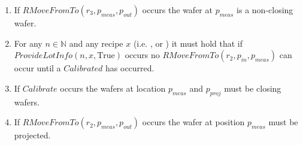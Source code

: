 \begin{enumerate}
    \item If $RMoveFromTo(r_3,p_\mathit{meas}, p_\mathit{out})$ occurs the wafer at $p_\mathit{meas}$ is a non-closing wafer.

    \item For any $n \in \mathbb{N}$ and any recipe $x$ (i.e. \recipeOne, \recipeTwo or \recipeThree) it must hold that if $\mathit{ProvideLotInfo}(n, x, \text{True})$ occurs no $\mathit{RMoveFromTo}(r_2, p_\mathit{in}, p_\mathit{meas})$ can occur until a $\mathit{Calibrated}$ has occurred.
    \item If $Calibrate$ occurs the wafers at location $p_\mathit{meas}$ and $p_\mathit{proj}$ must be closing wafers.
    \item If $\mathit{RMoveFromTo}\left(r_2, p_\mathit{meas}, p_\mathit{out}\right)$ occurs the wafer at position $p_\mathit{meas}$ must be projected.
\end{enumerate}
